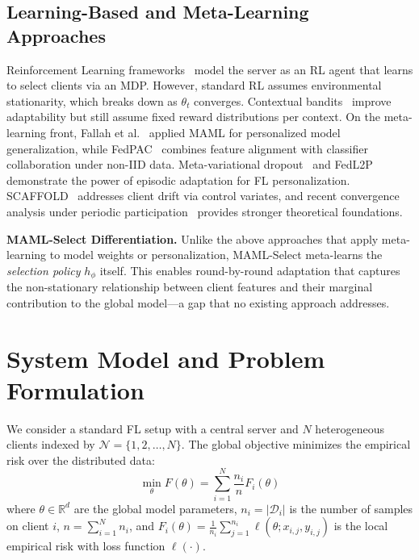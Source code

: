 \documentclass[journal]{IEEEtran}
\begin{document}
\subsection{Learning-Based and Meta-Learning Approaches}
Reinforcement Learning frameworks~\cite{wang2020optimizing} model the server as an RL agent that learns to select clients via an MDP. However, standard RL assumes environmental stationarity, which breaks down as $\theta_t$ converges. Contextual bandits~\cite{pan2024contextual} improve adaptability but still assume fixed reward distributions per context. On the meta-learning front, Fallah et al.~\cite{fallah2020personalized} applied MAML for personalized model generalization, while FedPAC~\cite{xu2023fedpac} combines feature alignment with classifier collaboration under non-IID data. Meta-variational dropout~\cite{jeon2023metavd} and FedL2P~\cite{lee2023fedl2p} demonstrate the power of episodic adaptation for FL personalization. SCAFFOLD~\cite{karimireddy2020scaffold} addresses client drift via control variates, and recent convergence analysis under periodic participation~\cite{crawshaw2024amplified} provides stronger theoretical foundations.

\textbf{MAML-Select Differentiation.} Unlike the above approaches that apply meta-learning to model weights or personalization, MAML-Select meta-learns the \textit{selection policy} $h_\phi$ itself. This enables round-by-round adaptation that captures the non-stationary relationship between client features and their marginal contribution to the global model---a gap that no existing approach addresses.

\section{System Model and Problem Formulation}
We consider a standard FL setup with a central server and $N$ heterogeneous clients indexed by $\mathcal{N} = \{1, 2, \ldots, N\}$. The global objective minimizes the empirical risk over the distributed data:
\begin{equation}
	\min_{\theta} F(\theta) = \sum_{i=1}^{N} \frac{n_i}{n} F_i(\theta)
	\label{eq:global_objective}
\end{equation}
where $\theta \in \mathbb{R}^d$ are the global model parameters, $n_i = |\mathcal{D}_i|$ is the number of samples on client $i$, $n = \sum_{i=1}^{N} n_i$, and $F_i(\theta) = \frac{1}{n_i} \sum_{j=1}^{n_i} \ell(\theta; x_{i,j}, y_{i,j})$ is the local empirical risk with loss function $\ell(\cdot)$.
\end{document}
